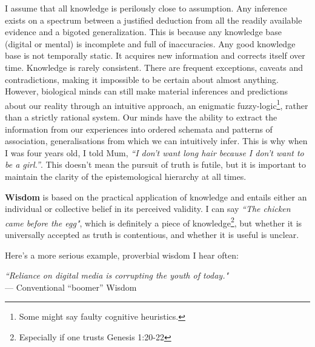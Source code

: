 
I assume that all knowledge is perilously close to assumption. Any inference exists on a spectrum between a justified deduction from all the readily available evidence and a bigoted generalization. This is because any knowledge base (digital or mental) is incomplete and full of inaccuracies. Any good knowledge base is not temporally static. It acquires new information and corrects itself over time. Knowledge is rarely consistent. There are frequent exceptions, caveats and contradictions, making it impossible to be certain about almost anything. However, biological minds can still make material inferences and predictions about our reality through an intuitive approach, an enigmatic fuzzy-logic\footnote{Some might say faulty cognitive heuristics.}, rather than a strictly rational system. Our minds have the ability to extract the information from our experiences into ordered schemata and patterns of association, generalisations from which we can intuitively infer. This is why when I was four years old, I told Mum, \textit{``I don't want long hair because I don't want to be a girl.''}. This doesn't mean the pursuit of truth is futile, but it is important to maintain the clarity of the epistemological hierarchy at all times.


\textbf{Wisdom} is based on the practical application of knowledge and entails either an individual or collective belief in its perceived validity. I can say \textit{``The chicken came before the egg"}, which is definitely a piece of knowledge\footnote{Especially if one trusts Genesis 1:20-22}, but whether it is universally accepted as truth is contentious, and whether it is useful is unclear. 

Here's a more serious example, proverbial wisdom I hear often:

\begin{center}
\textit{``Reliance on digital media is corrupting the youth of today."}
\\ --- Conventional ``boomer'' Wisdom
\end{center}

